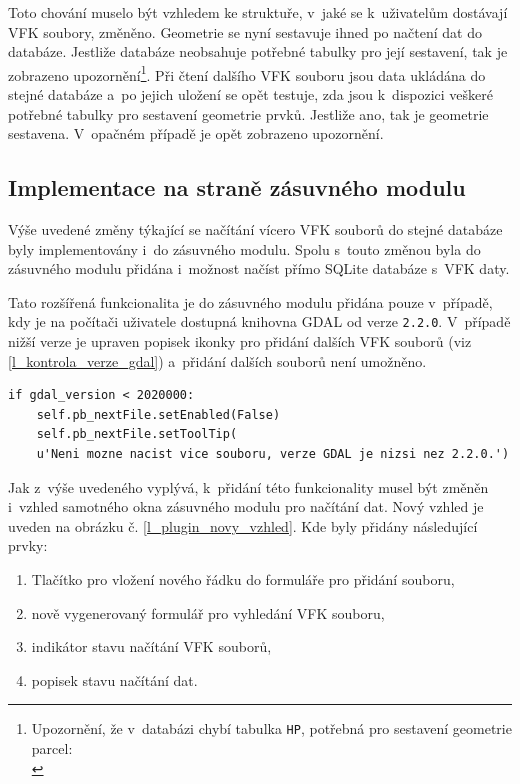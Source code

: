 \documentclass[a4paper,12pt,oneside]{book}
\begin{document}
Toto chování muselo být vzhledem ke struktuře, v~jaké se k~uživatelům
dostávají VFK soubory, změněno. Geometrie se nyní sestavuje ihned po
načtení dat do databáze. Jestliže databáze neobsahuje potřebné tabulky
pro její sestavení, tak je zobrazeno upozornění\footnote{Upozornění,
  že v~databázi chybí tabulka \texttt{HP}, potřebná pro sestavení
  geometrie parcel:\\}. Při čtení dalšího VFK souboru jsou data
ukládána do stejné databáze a~po jejich uložení se opět testuje, zda
jsou k~dispozici veškeré potřebné tabulky pro sestavení geometrie
prvků. Jestliže ano, tak je geometrie sestavena. V~opačném případě je
opět zobrazeno upozornění.

\subsection{Implementace na straně zásuvného modulu}
Výše uvedené změny týkající se načítání vícero VFK souborů do stejné
databáze byly implementovány i~do zásuvného modulu. Spolu s~touto
změnou byla do zásuvného modulu přidána i~možnost načíst přímo SQLite
databáze s~VFK daty.

Tato rozšířená funkcionalita je do zásuvného modulu přidána pouze
v~případě, kdy je na počítači uživatele dostupná knihovna GDAL od
verze \texttt{2.2.0}. V~případě nižší verze je upraven popisek
ikonky pro přidání dalších VFK souborů (viz
\ref{l_kontrola_verze_gdal}) a~přidání dalších souborů není umožněno.

{\scriptsize
\begin{lstlisting}[style=python, 
		    caption={Kontrola verze GDAL na straně VFK pluginu}, 
		    label=l_kontrola_verze_gdal]
if gdal_version < 2020000:
    self.pb_nextFile.setEnabled(False)
    self.pb_nextFile.setToolTip(
	u'Neni mozne nacist vice souboru, verze GDAL je nizsi nez 2.2.0.')
\end{lstlisting}
}

Jak z~výše uvedeného vyplývá, k~přidání této funkcionality musel
být změněn i~vzhled samotného okna zásuvného modulu pro načítání
dat. Nový vzhled je uveden na obrázku
č. \ref{l_plugin_novy_vzhled}. Kde byly přidány následující prvky:

\begin{enumerate}
 \item Tlačítko pro vložení nového řádku do formuláře pro přidání souboru,
 \item nově vygenerovaný formulář pro vyhledání VFK souboru,
 \item indikátor stavu načítání VFK souborů,
 \item popisek stavu načítání dat.
\end{enumerate}
\end{document}
